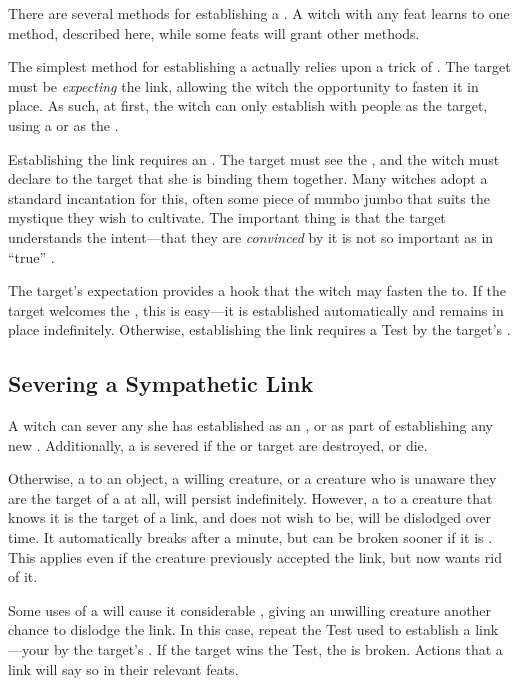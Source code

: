 There are several methods for establishing a {\symlink}.
A witch with any  feat learns to one method, described here, while some feats will grant other methods.

The simplest method for establishing a {\symlink} actually relies upon a trick of .
The target must be \emph{expecting} the link, allowing the witch the opportunity to fasten it in place.
As such, at first, the witch can only establish {\symlinks} with people as the target, using a  or  as the {\symbol}.

Establishing the link requires an {\action}.
The target must see the {\symbol}, and the witch must declare to the target that she is binding them together.
Many witches adopt a standard incantation for this, often some piece of mumbo jumbo that suits the mystique they wish to cultivate.
The important thing is that the target understands the intent---that they are \emph{convinced} by it is not so important as in ``true'' .

The target's expectation provides a hook that the witch may fasten the {\symlink} to.
If the target welcomes the {\symlink}, this is easy---it is established automatically and remains in place indefinitely.
Otherwise, establishing the link requires a  Test {\opposed} by the target's .

\subsection{Severing a Sympathetic Link}

A witch can sever any {\symlink} she has established as an {\action}, or as part of establishing any new {\symlink}.
Additionally, a {\symlink} is severed if the {\symbol} or target are destroyed, or die.

Otherwise, a {\symlink} to an object, a willing creature, or a creature who is unaware they are the target of a {\symlink} at all, will persist indefinitely.
However, a {\symlink} to a creature that knows it is the target of a link, and does not wish to be, will be dislodged over time.
It automatically breaks after a minute, but can be broken sooner if it is {\stressed}.
This applies even if the creature previously accepted the link, but now wants rid of it.

Some uses of a {\symlink} will cause it considerable {\stress}, giving an unwilling creature another chance to dislodge the link.
In this case, repeat the Test used to establish a link---your  {\opposed} by the target's .
If the target wins the Test, the {\symlink} is broken.
Actions that {\stress} a link will say so in their relevant feats.

